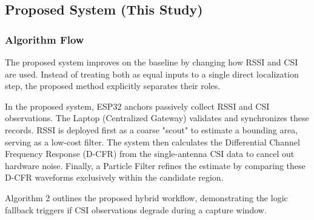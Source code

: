 \subsection{Proposed System (This Study)}

\subsubsection{Algorithm Flow}

The proposed system improves on the baseline by changing how RSSI and CSI are used. Instead of treating both as equal inputs to a single direct localization step, the proposed method explicitly separates their roles. 

In the proposed system, ESP32 anchors passively collect RSSI and CSI observations. The Laptop (Centralized Gateway) validates and synchronizes these records. RSSI is deployed first as a coarse "scout" to estimate a bounding area, serving as a low-cost filter. The system then calculates the Differential Channel Frequency Response (D-CFR) from the single-antenna CSI data to cancel out hardware noise. Finally, a Particle Filter refines the estimate by comparing these D-CFR waveforms exclusively within the candidate region. 

Algorithm 2 outlines the proposed hybrid workflow, demonstrating the logic fallback triggers if CSI observations degrade during a capture window.

